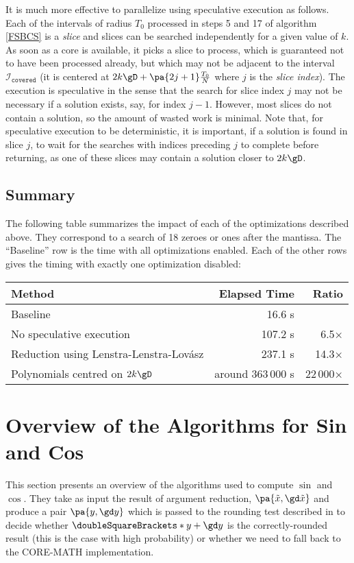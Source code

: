 \documentclass[10pt, a4paper, twoside]{basestyle}
\newcommand{\round}[1]{\doubleSquareBrackets*{#1}}
\newcommand{\red}[1]{\tilde{#1}}
\begin{document}
It is much more effective to parallelize using speculative execution as follows.  Each of the intervals of radius $T_0$ processed in steps 5 and 17 of algorithm \ref{FSBCS} is a \emph{slice} and slices can be searched independently for a given value of $k$.  As soon as a core is available, it picks a slice to process, which is guaranteed not to have been processed already, but which may not be adjacent to the interval $\mathscr{I}_{\texttt{covered}}$ (it is centered at $2 k \gD + \pa{2 j + 1} \frac{T_0}{N}$ where $j$ is the \emph{slice index}).  The execution is speculative in the sense that the search for slice index $j$ may not be necessary if a solution exists, say, for index $j - 1$.  However, most slices do not contain a solution, so the amount of wasted work is minimal.  Note that, for speculative execution to be deterministic, it is important, if a solution is found in slice $j$, to wait for the searches with indices preceding $j$ to complete before returning, as one of these slices may contain a solution closer to $2 k \gD$.

\subsection*{Summary}

The following table summarizes the impact of each of the optimizations described above.  They correspond to a search of 18 zeroes or ones after the mantissa.  The ``Baseline'' row is the time with all optimizations enabled.  Each of the other rows gives the timing with exactly one optimization disabled:
\begin{center}
\begin{tabular}{lrr}
Method & Elapsed Time & Ratio \\
\hline
Baseline & 16.6 s &  \\
No speculative execution & 107.2 s & 6.5× \\
Reduction using Lenstra-Lenstra-Lovász & 237.1 s & 14.3× \\
Polynomials centred on $2 k \gD$ & around 363\,000 s & 22\,000×
\end{tabular}
\end{center}

\section*{Overview of the Algorithms for Sin and Cos}\label{overview}

This section presents an overview of the algorithms used to compute $\sin$ and $\cos$.  They take as input the result of argument reduction, $\pa{\red x, \gd \red x}$ and produce a pair $\pa{y, \gd y}$ which is passed to the rounding test described in \cite[397]{MullerBrisebarreDeDinechinJeannerodLefevreMelquiondRevolStehleTorres2010} to decide whether $\round{y + \gd y}$ is the correctly-rounded result (this is the case with high probability) or whether we need to fall back to the CORE-MATH implementation.
\end{document}
